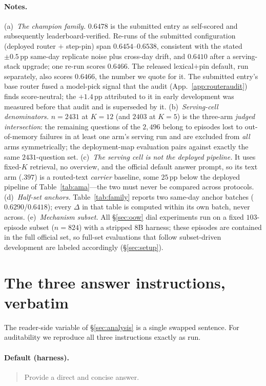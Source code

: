 \documentclass{article} %
\newcommand{\pp}{\,\mathrm{pp}}
\begin{document}
\paragraph{Notes.}
(a)~\emph{The champion family.} $0.6478$ is the submitted entry as self-scored and
subsequently leaderboard-verified. Re-runs of the submitted configuration (deployed
router $+$ step-pin) span $0.6454$--$0.6538$, consistent with the stated
$\pm0.5\pp$ same-day replicate noise plus cross-day drift, and $0.6410$ after a serving-stack
upgrade; one re-run scores $0.6466$. The released lexical$+$pin default, run separately,
also scores $0.6466$, the number we quote for it. The submitted entry's base router fused a
model-pick signal that the audit (App.~\ref{app:routeraudit}) finds score-neutral;
the $+1.4\pp$ attributed to it in early development was measured before that audit
and is superseded by it.
(b)~\emph{Serving-cell denominators.} $n{=}2431$ at $K{=}12$ (and $2403$ at $K{=}5$)
is the three-arm \emph{judged intersection}: the remaining questions of the
$2{,}496$ belong to episodes lost to out-of-memory failures in at least one arm's
serving run and are excluded from \emph{all} arms symmetrically; the deployment-map
evaluation pairs against exactly the same $2431$-question set.
(c)~\emph{The serving cell is not the deployed pipeline.} It uses fixed-$K$
retrieval, no overview, and the official default answer prompt, so its text arm
($.397$) is a routed-text \emph{carrier} baseline, some $25\pp$ below the deployed
pipeline of Table~\ref{tab:ama}---the two must never be compared across protocols.
(d)~\emph{Half-set anchors.} Table~\ref{tab:family} reports two same-day anchor
batches ($0.6290$/$0.6418$); every $\Delta$ in that table is computed within its own
batch, never across.
(e)~\emph{Mechanism subset.} All \S\ref{sec:oow} dial experiments run on a fixed
$103$-episode subset ($n{=}824$) with a stripped 8B harness; these episodes are
contained in the full official set, so full-set evaluations that follow subset-driven
development are labeled accordingly (\S\ref{sec:setup}).

\section{The three answer instructions, verbatim}
\label{app:instr}

The reader-side variable of \S\ref{sec:analysis} is a single swapped sentence.
For auditability we reproduce all three instructions exactly as run.

\paragraph{Default (harness).}
\begin{quote}\small
Provide a direct and concise answer.
\end{quote}
\end{document}
